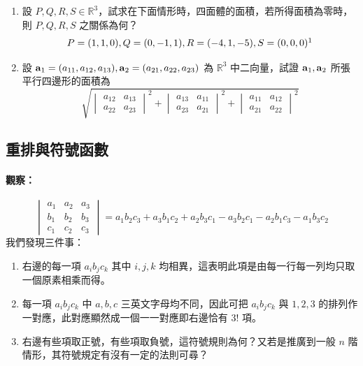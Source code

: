 \begin{enumerate}[label=\arabic*., leftmargin=2em]
  \item 設 $P, Q, R, S \in \mathbb{R}^3$，試求在下面情形時，四面體的面積，若所得面積為零時，則 $P, Q, R, S$ 之關係為何？
  \label{note:b6-ch1-p30-s-coord}%
  \[ P=(1, 1, 0), Q=(0, -1, 1), R=(-4, 1, -5), S=(0, 0, 0)\footnotemark \]

  \item 設 $\boldsymbol{\mathbf{a}}_1=(a_{11}, a_{12}, a_{13}), \boldsymbol{\mathbf{a}}_2=(a_{21}, a_{22}, a_{23})$ 為 $\mathbb{R}^3$ 中二向量，試證 $\boldsymbol{\mathbf{a}}_1, \boldsymbol{\mathbf{a}}_2$ 所張平行四邊形的面積為
  \[ \sqrt{\begin{vmatrix} a_{12} & a_{13} \\ a_{22} & a_{23} \end{vmatrix}^2 + \begin{vmatrix} a_{13} & a_{11} \\ a_{23} & a_{21} \end{vmatrix}^2 + \begin{vmatrix} a_{11} & a_{12} \\ a_{21} & a_{22} \end{vmatrix}^2} \]
\end{enumerate}

\subsection{重排與符號函數}\label{sec:b6-1-3}
\resetsectcounters

\paragraph{觀察：}
\begin{equation}
\begin{vmatrix}
a_1 & a_2 & a_3 \\
b_1 & b_2 & b_3 \\
c_1 & c_2 & c_3
\end{vmatrix} = a_1 b_2 c_3 + a_3 b_1 c_2 + a_2 b_3 c_1 - a_3 b_2 c_1 - a_2 b_1 c_3 - a_1 b_3 c_2 \label{eq:b6-1-3-1}
\end{equation}
我們發現三件事：
\begin{enumerate}[label=\arabic*., leftmargin=2em]
  \item 右邊的每一項 $a_i b_j c_k$ 其中 $i, j, k$ 均相異，這表明此項是由每一行每一列均只取一個原素相乘而得。
  \item 每一項 $a_i b_j c_k$ 中 $a, b, c$ 三英文字母均不同，因此可把 $a_i b_j c_k$ 與 $1, 2, 3$ 的排列作一對應，此對應顯然成一個一一對應即右邊恰有 $3!$ 項。
  \item 右邊有些項取正號，有些項取負號，這符號規則為何？又若是推廣到一般 $n$ 階情形，其符號規定有沒有一定的法則可尋？
\end{enumerate}


